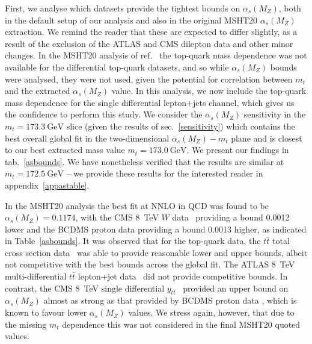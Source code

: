 \documentclass[sn-mathphys]{sn-jnl}%
\newcommand{\ytt}{y_{t\bar{t}}}
\newcommand{\mt}{m_t}
\newcommand{\ttbar}{t\bar{t}}
\newcommand{\as}{\alpha_s(M_Z)}
\newcommand{\gev}{\mathrm{GeV}}
\begin{document}
First, we analyse which datasets provide the tightest bounds on $\as$, both in the default setup of our analysis and also in the original MSHT20 $\as$ extraction. We remind the reader that these are expected to differ slightly, as a result of the exclusion of the ATLAS and CMS dilepton data and other minor changes. In the MSHT20 analysis of ref.~\cite{Cridge:2021qfd} the top-quark mass dependence was not available for the differential top-quark datasets, and so while $\as$ bounds were analysed, they were not used, given the potential for correlation between $\mt$ and the extracted $\as$ value. In this analysis, we now include the top-quark mass dependence for the single differential lepton+jets channel, which gives us the confidence to perform this study. We consider the $\as$ sensitivity in the $\mt=173.3~\mathrm{GeV}$ slice (given the results of sec.~\ref{sensitivity}) which contains the best overall global fit in the two-dimensional $\as-\mt$ plane and is closest to our best extracted mass value $\mt=173.0~\gev$. We present our findings in tab.~\ref{asbounds}.
 We have nonetheless verified that the results are similar at $\mt=172.5~\mathrm{GeV}$ -- we provide these results for the interested reader in appendix~\ref{appastable}. 
 
In the MSHT20 analysis the best fit at NNLO in QCD was found to be $\as=0.1174$, with the CMS 8~TeV $W$ data~\cite{CMS:2016qqr} providing a bound 0.0012 lower and the BCDMS proton data providing a bound 0.0013 higher, as indicated in Table~\ref{asbounds}. It was observed that for the top-quark data, the $\ttbar$ total cross section  data~\cite{ATLAS:2010zaw,ATLAS:2011whm,ATLAS:2012ptu,ATLAS:2012aa,ATLAS:2012xru,ATLAS:2012qtn,ATLAS:2015xtk,CMS:2012ahl,CMS:2012exf,CMS:2012hcu,CMS:2013nie,CMS:2013yjt,CMS:2013hon,CMS:2014btv,CMS:2015auz,CDF:2013hmv} was able to provide reasonable lower and upper bounds, albeit not competitive with the best bounds across the global fit. The ATLAS 8~TeV multi-differential $\ttbar$ lepton+jet data~\cite{ATLAS:2015lsn} did not provide competitive bounds. In contrast, the CMS 8~TeV single differential $\ytt$~\cite{CMS:2015rld} provided an upper bound on $\as$ almost as strong as that provided by BCDMS proton data \cite{BCDMS}, which is known to favour lower $\as$ values. We stress again, however, that due to the missing $\mt$ dependence this was not considered in the final MSHT20 quoted values.
\end{document}
